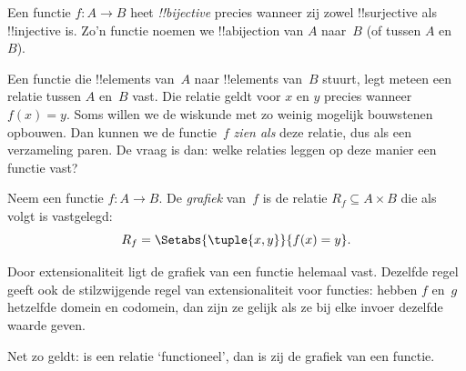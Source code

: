 \documentclass[openany]{memoir}
\begin{document}
\begin{defn}[!!^{bijection}]
Een functie $f \colon A \to B$ heet \emph{!!{bijective}} precies
wanneer zij zowel !!{surjective} als !!{injective} is. Zo'n functie
noemen we !!a{bijection} van $A$ naar~$B$ (of tussen $A$ en~$B$).
\end{defn}
\endgroup

\begingroup
\def\olfilename{OLP-0023}
\def\olfilepath{content/sets-functions-relations/functions/}
\hypertarget{unit-OLP-0023}{}






\begin{explain}
Een functie die !!{element}s van~$A$ naar !!{element}s van~$B$ stuurt,
legt meteen een relatie tussen $A$ en~$B$ vast. Die relatie geldt voor
$x$ en $y$ precies wanneer $f(x) = y$. Soms willen we de wiskunde met
zo weinig mogelijk bouwstenen opbouwen. Dan kunnen we de functie~$f$
\emph{zien als} deze relatie, dus als een verzameling paren. De vraag
is dan: welke relaties leggen op deze manier een functie vast?
\end{explain}

\begin{defn} Neem een functie $f\colon A \to
B$. De \emph{grafiek} van~$f$ is de relatie $R_f \subseteq A \times
B$ die als volgt is vastgelegd:
\[
R_f = \Setabs{\tuple{x,y}}{f(x) = y}.
\]
\end{defn}

\begin{explain}
Door extensionaliteit ligt de grafiek van een functie helemaal vast.
Dezelfde regel geeft ook de stilzwijgende regel van extensionaliteit
voor functies: hebben $f$ en~$g$ hetzelfde domein en codomein, dan
zijn ze gelijk als ze bij elke invoer dezelfde waarde geven.

Net zo geldt: is een relatie ‘functioneel’, dan is zij de grafiek van
een functie.
\end{explain}
\end{document}
